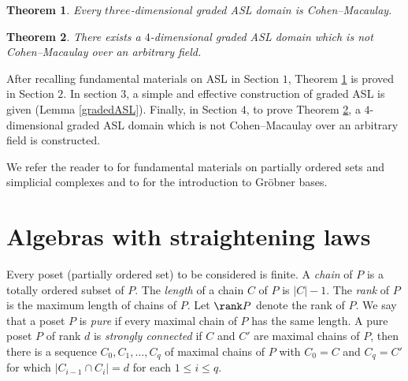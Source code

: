 \documentclass[12pt]{amsart}
\newtheorem{Theorem}{Theorem}[section]
\begin{document}
    \begin{Theorem}
\label{ASLdomain}
Every $three$-dimensional graded ASL domain is Cohen--Macaulay.   
\end{Theorem}

\begin{Theorem}
\label{counterexample}
There exists a $4$-dimensional graded ASL domain which is not Cohen--Macaulay over an arbitrary field.   
\end{Theorem}

After recalling fundamental materials on ASL in Section $1$, Theorem \ref{ASLdomain} is proved in Section $2$.  In section $3$, a simple and effective construction of graded ASL is given (Lemma \ref{gradedASL}).  Finally, in Section $4$, to prove Theorem \ref{counterexample}, a $4$-dimensional graded ASL domain which is not Cohen--Macaulay over an arbitrary field is constructed.

We refer the reader to \cite{HIBIred, StaGREEN} for fundamental materials on partially ordered sets and simplicial complexes and to \cite[Chapter 2]{HHgtm260} for the introduction to Gr\"obner bases.

\section{Algebras with straightening laws} 
Every poset (partially ordered set) to be considered is finite.  A {\em chain} of $P$ is a totally ordered subset of $P$.  The {\em length} of a chain $C$ of $P$ is $|C|-1$.  The {\em rank} of $P$ is the maximum length of chains of $P$.  Let $\rank P$ denote the rank of $P$.  We say that a poset $P$ is {\em pure} if every maximal chain of $P$ has the same length.  A pure poset $P$ of rank $d$ is {\em strongly connected} if $C$ and $C'$ are maximal chains of $P$, then there is a sequence $C_0,C_1,\ldots, C_q$ of maximal chains of $P$ with $C_0=C$ and $C_q=C'$ for which $|C_{i-1} \cap C_{i}| = d$ for each $1 \leq i \leq q$.  

     
\end{document}
